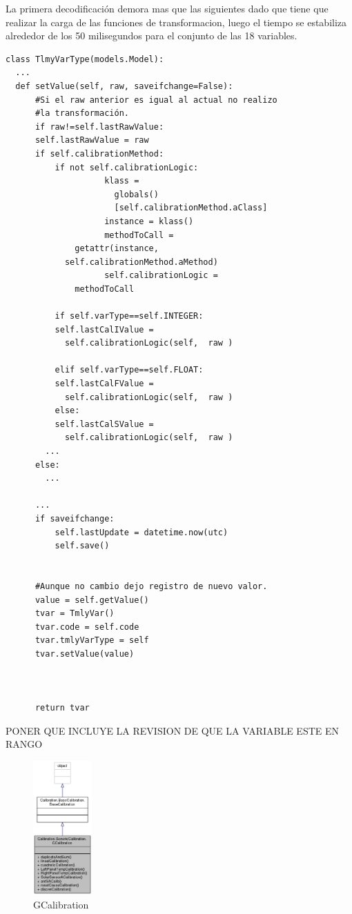 \documentclass[twoside,twocolumn]{article}
\begin{document}
{{La primera decodificación demora mas que las siguientes dado que tiene que realizar la carga de las funciones de transformacion, luego el tiempo se estabiliza alrededor de los 50 milisegundos para el conjunto de las 18 variables. 



\begin{verbatim}
class TlmyVarType(models.Model):
  ...
  def setValue(self, raw, saveifchange=False):
      #Si el raw anterior es igual al actual no realizo
      #la transformación.
      if raw!=self.lastRawValue:
	  self.lastRawValue = raw
	  if self.calibrationMethod: 
	      if not self.calibrationLogic:
                    klass = 
                      globals()
                      [self.calibrationMethod.aClass]
                    instance = klass()
                    methodToCall = 
		      getattr(instance, 
			self.calibrationMethod.aMethod)
                    self.calibrationLogic = 
		      methodToCall   
                
	      if self.varType==self.INTEGER:
		  self.lastCalIValue = 
		    self.calibrationLogic(self,  raw )
	  
	      elif self.varType==self.FLOAT:
		  self.lastCalFValue = 
		    self.calibrationLogic(self,  raw )
	      else:
		  self.lastCalSValue = 
		    self.calibrationLogic(self,  raw )
		...
	  else:
		...
	
	  ...
	  if saveifchange:
	      self.lastUpdate = datetime.now(utc)
	      self.save()
      
	
      #Aunque no cambio dejo registro de nuevo valor.
      value = self.getValue()
      tvar = TmlyVar()
      tvar.code = self.code
      tvar.tmlyVarType = self
      tvar.setValue(value)
      
      

      return tvar
\end{verbatim}



PONER QUE INCLUYE LA REVISION DE QUE LA VARIABLE ESTE EN RANGO




\begin{figure}[]
  \caption{GCalibration}
  \label{fig:GCalibration}
  \centering
  \includegraphics[width=0.2\textwidth]{Imagenes/GenericCalibration.png}
\end{figure}


}}
\end{document}
